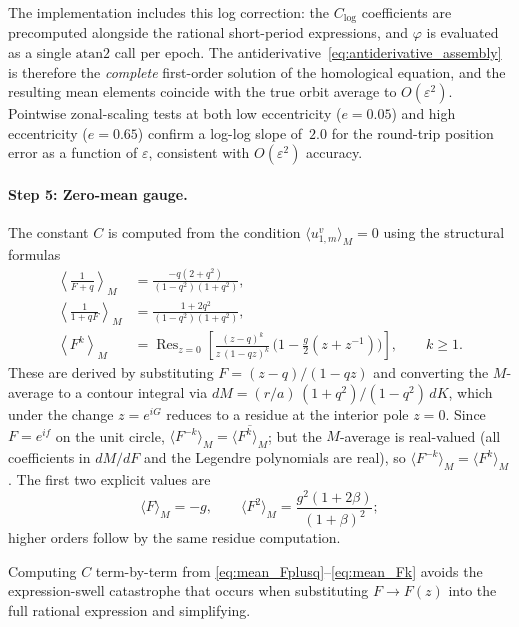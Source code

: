 \documentclass[11pt]{article}
\begin{document}
The implementation includes this log correction: the $C_{\log}$
coefficients are precomputed alongside the rational short-period
expressions, and $\varphi$ is evaluated as a single $\mathrm{atan2}$
call per epoch.  The antiderivative~\eqref{eq:antiderivative_assembly}
is therefore the \emph{complete} first-order solution of the homological
equation, and the resulting mean elements coincide with the true orbit
average to $O(\varepsilon^2)$.  Pointwise zonal-scaling tests at both
low eccentricity ($e = 0.05$) and high eccentricity ($e = 0.65$)
confirm a log-log slope of~$2.0$ for the round-trip position error as a
function of $\varepsilon$, consistent with $O(\varepsilon^2)$ accuracy.

\paragraph{Step 5: Zero-mean gauge.}
The constant $C$ is computed from the condition
$\langle u_{1,m}^v \rangle_M = 0$ using the structural formulas
\begin{align}
\left\langle \frac{1}{F+q} \right\rangle_M
&= \frac{-q(2+q^2)}{(1-q^2)(1+q^2)},
\label{eq:mean_Fplusq}\\
\left\langle \frac{1}{1+qF} \right\rangle_M
&= \frac{1+2q^2}{(1-q^2)(1+q^2)},
\label{eq:mean_1plusqF}\\
\left\langle F^k \right\rangle_M
&= \operatorname{Res}_{z=0}
\left[
\frac{(z-q)^k}{z\,(1-qz)^k}\,
\bigl(1-\tfrac{g}{2}(z+z^{-1})\bigr)
\right],
\qquad k \ge 1.
\label{eq:mean_Fk}
\end{align}
These are derived by substituting $F = (z-q)/(1-qz)$ and converting the
$M$-average to a contour integral via
$dM = (r/a)\,(1+q^2)/(1-q^2)\,dK$, which under the change $z = e^{iG}$
reduces to a residue at the interior pole $z = 0$.
Since $F = e^{if}$ on the unit circle,
$\langle F^{-k}\rangle_M = \overline{\langle F^k\rangle_M}$;
but the $M$-average is real-valued (all coefficients
in $dM/dF$ and the Legendre polynomials are real), so
$\langle F^{-k}\rangle_M = \langle F^k\rangle_M$.
The first two explicit values are
\begin{equation}
\langle F \rangle_M = -g,
\qquad
\langle F^2 \rangle_M = \frac{g^2(1+2\beta)}{(1+\beta)^2};
\end{equation}
higher orders follow by the same residue computation.

Computing $C$ term-by-term from
\eqref{eq:mean_Fplusq}--\eqref{eq:mean_Fk} avoids the expression-swell
catastrophe that occurs when substituting $F \to F(z)$ into the full
rational expression and simplifying.
\end{document}
